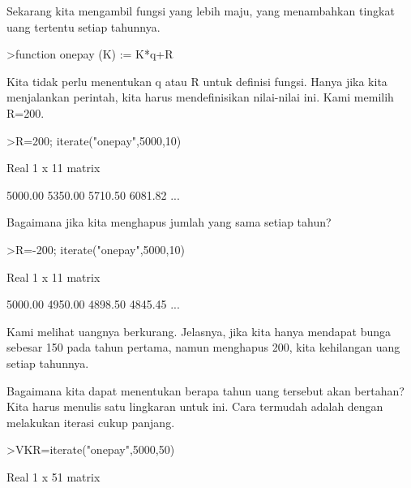 \documentclass{article}
\begin{document}
\begin{eulernotebook}
\begin{eulercomment}
\begin{eulercomment}
\begin{eulercomment}
\begin{eulercomment}
\begin{eulercomment}
\begin{eulercomment}
\begin{eulercomment}
\begin{eulercomment}
\begin{eulercomment}
\begin{eulercomment}
\begin{eulercomment}
Sekarang kita mengambil fungsi yang lebih maju, yang menambahkan
tingkat uang tertentu setiap tahunnya.
\end{eulercomment}
\begin{eulerprompt}
>function onepay (K) := K*q+R
\end{eulerprompt}
\begin{eulercomment}
Kita tidak perlu menentukan q atau R untuk definisi fungsi. Hanya jika
kita menjalankan perintah, kita harus mendefinisikan nilai-nilai ini.
Kami memilih R=200.
\end{eulercomment}
\begin{eulerprompt}
>R=200; iterate("onepay",5000,10)
\end{eulerprompt}
\begin{euleroutput}
  Real 1 x 11 matrix
  
      5000.00     5350.00     5710.50     6081.82     ...
\end{euleroutput}
\begin{eulercomment}
Bagaimana jika kita menghapus jumlah yang sama setiap tahun?
\end{eulercomment}
\begin{eulerprompt}
>R=-200; iterate("onepay",5000,10)
\end{eulerprompt}
\begin{euleroutput}
  Real 1 x 11 matrix
  
      5000.00     4950.00     4898.50     4845.45     ...
\end{euleroutput}
\begin{eulercomment}
Kami melihat uangnya berkurang. Jelasnya, jika kita hanya mendapat
bunga sebesar 150 pada tahun pertama, namun menghapus 200, kita
kehilangan uang setiap tahunnya.

Bagaimana kita dapat menentukan berapa tahun uang tersebut akan
bertahan? Kita harus menulis satu lingkaran untuk ini. Cara termudah
adalah dengan melakukan iterasi cukup panjang.
\end{eulercomment}
\begin{eulerprompt}
>VKR=iterate("onepay",5000,50)
\end{eulerprompt}
\begin{euleroutput}
  Real 1 x 51 matrix
  

\end{euleroutput}
\end{eulercomment}
\end{eulercomment}
\end{eulercomment}
\end{eulercomment}
\end{eulercomment}
\end{eulercomment}
\end{eulercomment}
\end{eulercomment}
\end{eulercomment}
\end{eulercomment}
\end{eulernotebook}
\end{document}
